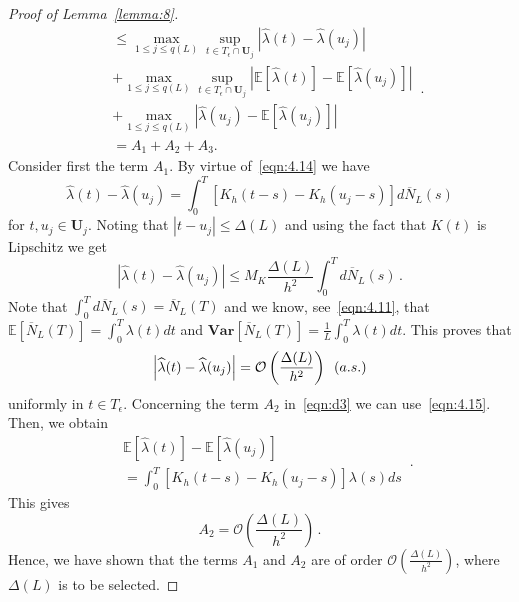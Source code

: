 \documentclass[lettersize,journal,onecolumn]{IEEEtran}
\theoremstyle{definition}
\newcommand{\E}[1]{\mathbb{E}\left[#1\right]}
\newcommand{\Var}[1]{\mathbf{Var}\left[#1\right]}
\begin{document}
\begin{proof}[Proof of Lemma~\ref{lemma:8}]
\begin{equation}
\begin{split}
			& \leq \max_{1\leq j\leq q(L)} \sup_{t\in T_{\epsilon}\cap \mathbf{U}_j}
			\left|\widehat{\lambda}(t)-\widehat{\lambda}(u_{j})\right| \\
			& + \max_{1\leq j\leq q(L)} \sup_{t\in T_{\epsilon}\cap \mathbf{U}_j}
			\left|\E{\widehat{\lambda}(t)}-\E{\widehat{\lambda}(u_{j})}\right| \\
			& + \max_{1\leq j\leq q(L)} \left|
			\widehat{\lambda}(u_{j}) - \E{\widehat{\lambda}(u_{j})}
			\right| \\
			& = A_{1} + A_{2} + A_{3}.
		\end{split}
		\label{eqn:d3} \,.
	\end{equation}
	Consider first the term $A_{1}$. By virtue of~\eqref{eqn:4.14} we have
	\begin{equation*}
		\widehat{\lambda}(t)-\widehat{\lambda}(u_{j}) = \int_{0}^{T} \left[
		K_{h}(t-s)-K_{h}(u_{j}-s)
		\right] d\overline{N}_{L}(s)
	\end{equation*}
	for $t,u_{j}\in\mathbf{U}_{j}$. Noting that \mbox{$|t-u_{j}|\leq\Delta(L)$} and using 
	the fact that $K(t)$ is Lipschitz we get
	\begin{equation}
		\left|\widehat{\lambda}(t)-\widehat{\lambda}(u_{j})\right| \leq
		M_{K}\frac{\Delta(L)}{h^{2}} \int_{0}^{T} d\overline{N}_{L}(s)
		\label{eqn:d4} \,.
	\end{equation}
	Note that \mbox{$
		\int_{0}^{T} d\overline{N}_{L}(s) = \overline{N}_{L}(T)
		$} and we know, see~\eqref{eqn:4.11}, that \mbox{$
		\E{\overline{N}_{L}(T)} = \int_{0}^{T} \lambda(t)dt
		$} and \mbox{$
		\Var{\overline{N}_{L}(T)} = \frac{1}{L} \int_{0}^{T} \lambda(t)dt
		$}. This proves that
	\begin{equation}
		\left|\widehat{\lambda}(t)-\widehat{\lambda}(u_{j})\right| = 
		\mathcal{O}\left(\frac{\Delta(L)}{h^{2}}\right)
		\enspace \text(a.s.)
		\label{eqn:d5}
	\end{equation}
	uniformly in $t\in T_{\epsilon}$. Concerning the term $A_{2}$ in~\eqref{eqn:d3} we 
	can use~\eqref{eqn:4.15}. Then, we obtain
	\begin{equation*}
		\begin{split}
			& \E{\widehat{\lambda}(t)} - \E{\widehat{\lambda}(u_{j})} \\
			& = \int_{0}^{T} \left[
			K_{h}(t-s) - K_{h}(u_{j}-s)
			\right] \lambda(s) ds
		\end{split}
		\,.
	\end{equation*}
	This gives
	\begin{equation}
		A_{2} = \mathcal{O}\left(\frac{\Delta(L)}{h^{2}}\right)
		\label{eqn:d6} \,.
	\end{equation}
	Hence, we have shown that the terms $A_{1}$ and $A_{2}$ are of order \mbox{$
		\mathcal{O}\left(\frac{\Delta(L)}{h^{2}}\right)	
		$}, where $\Delta(L)$ is to be selected.
	

\end{proof}
\end{document}
